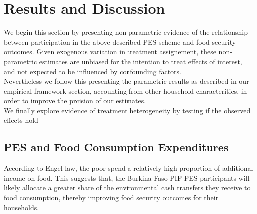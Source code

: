 \documentclass[preprint,12pt]{elsarticle}
\begin{document}
\newpage
\section{Results and Discussion}

We begin this section by presenting non-parametric evidence of the relationship between participation in the above described PES scheme and food security outcomes. Given exogenous variation in treatment assignement, these non-parametric estimates are unbiased for the intention to treat effects of interest, and not expected to be influenced by confounding factors.  \\



Nevertheless we follow this presenting the parametric results as described in our empirical framework section, accounting from other household characteritics, in order to improve the prcision of our estimates.  \\

We finally explore evidence of treatment heterogeneity by testing if the observed effects hold   



		
\FloatBarrier


\subsection{PES and Food Consumption Expenditures}

According to Engel law, the poor spend a relatively high proportion of additional income on food. This suggests that, the Burkina Faso PIF PES participants will likely allocate a greater share of the environmental cash transfers they receive to food consumption, thereby improving  food security outcomes for their households.
\end{document}
